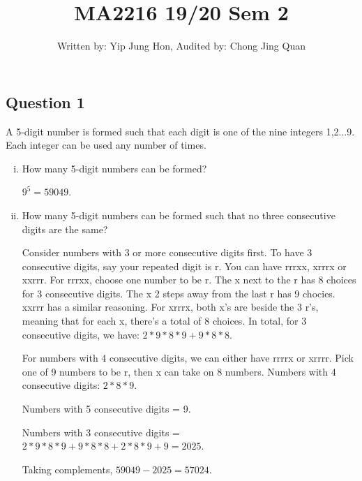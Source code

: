 \documentclass{article}
\title{MA2216 19/20 Sem 2}
\author{Written by: Yip Jung Hon, Audited by: Chong Jing Quan}
\begin{document}
\maketitle
\subsection*{Question 1}
A 5-digit number is formed such that each digit is one of the nine integers 1,2...9. Each integer can be used any number of times.
\begin{enumerate}[i)]
  \item How many 5-digit numbers can be formed?
  
  $9^5 = 59049$.
  \item How many 5-digit numbers can be formed such that no three consecutive digits are the same? 
  
 Consider numbers with 3 or more consecutive digits first. To have 3 consecutive digits, say your repeated digit is r. You can have rrrxx, xrrrx or xxrrr. For rrrxx, choose one number to be r. The x next to the r has 8 choices for 3 consecutive digits. The x 2 steps away from the last r has 9 chocies. xxrrr has a similar reasoning. For xrrrx, both x's are beside the 3 r's, meaning that for each x, there's a total of 8 choices. In total, for 3 consecutive digits, we have: $2*9*8*9 + 9*8*8$.
 
 For numbers with 4 consecutive digits, we can either have rrrrx or xrrrr. Pick one of 9 numbers to be r, then x can take on 8 numbers. Numbers with 4 consecutive digits: $2*8*9$.
 
 Numbers with 5 consecutive digits = 9.
  
  Numbers with 3 consecutive digits = $2*9*8*9 + 9*8*8 + 2*8*9 + 9 = 2025$.
  
  Taking complements, $59049-2025=57024$.
\end{enumerate}
\end{document}
